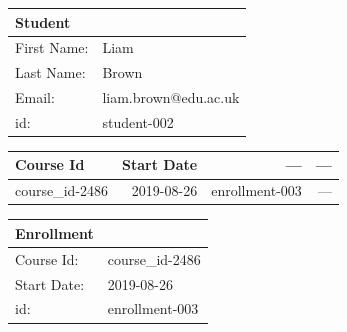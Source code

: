 \documentclass{article}
\begin{document}
\begin{tabular}{lp{5cm}}
  \textbf{Student} & \\
  \hline
  First Name: & Liam \\
  Last Name: & Brown \\
  Email: & liam.brown@edu.ac.uk \\
  id: & student-002 \\
\end{tabular}

\medskip

\begin{longtable}{lrrr}
  \toprule
  Course Id & Start Date & --- & --- \\
  \midrule
  course\_id-2486 & 2019-08-26 & enrollment-003 & --- \\
  \bottomrule
\end{longtable}

\medskip

\begin{tabular}{lp{5cm}}
  \textbf{Enrollment} & \\
  \hline
  Course Id: & course\_id-2486 \\
  Start Date: & 2019-08-26 \\
  id: & enrollment-003 \\
\end{tabular}
\end{document}

